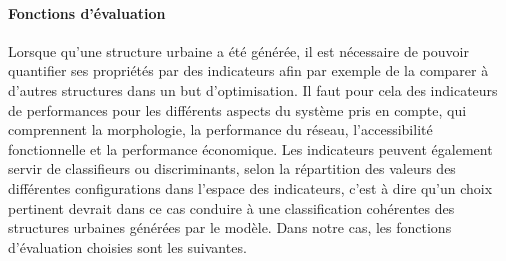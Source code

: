 \documentclass[french,12pt]{article}
\begin{document}
\paragraph{Fonctions d’évaluation}

Lorsque qu’une structure urbaine a été générée, il est nécessaire de pouvoir quantifier ses propriétés par des indicateurs afin par exemple de la comparer à d’autres structures dans un but d’optimisation. Il faut pour cela des indicateurs de performances pour les différents aspects du système pris en compte, qui comprennent la morphologie, la performance du réseau, l’accessibilité fonctionnelle et la performance économique. Les indicateurs peuvent également servir de classifieurs ou discriminants, selon la répartition des valeurs des différentes configurations dans l’espace des indicateurs, c’est à dire qu’un choix pertinent devrait dans ce cas conduire à une classification cohérentes des structures urbaines générées par le modèle. Dans notre cas, les fonctions d’évaluation choisies sont les suivantes.
\end{document}

